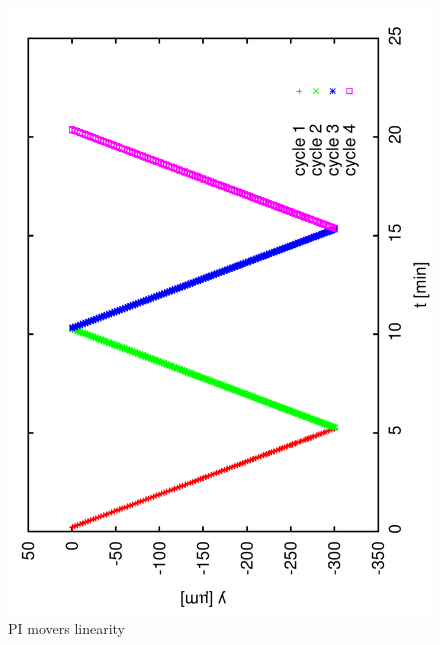 \documentclass[a4paper,11pt]{book}
\begin{document}
\begin{figure}[htb]
\centering
 \includegraphics[scale=0.3,angle=-90]{image01.pdf}\caption{PI movers linearity}\label{f-LinPI01}
\end{figure}
\end{document}
